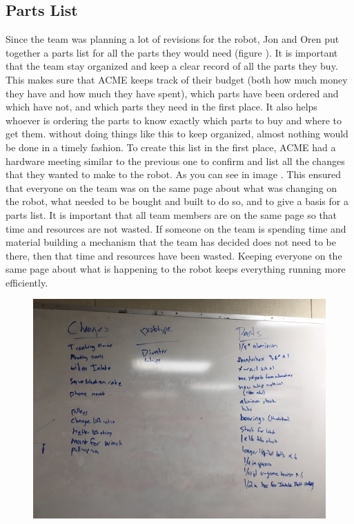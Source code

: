 \documentclass{article}
\begin{document}
\subsection{Parts List}
Since the team was planning a lot of revisions for the robot, Jon and Oren put together a parts list for all the parts they would need (figure ). It is important that the team stay organized and keep a clear record of all the parts they buy. This makes sure that ACME keeps track of their budget (both how much money they have and how much they have spent), which parts have been ordered and which have not, and which parts they need in the first place. It also helps whoever is ordering the parts to know exactly which parts to buy and where to get them. without doing things like this to keep organized, almost nothing would be done in a timely fashion. To create this list in the first place, ACME had a hardware meeting similar to the previous one to confirm and list all the changes that they wanted to make to the robot. As you can see in image . This ensured that everyone on the team was on the same page about what was changing on the robot, what needed to be bought and built to do so, and to give a basis for a parts list. It is important that all team members are on the same page so that time and resources are not wasted. If someone on the team is spending time and material building a mechanism that the team has decided does not need to be there, then that time and resources have been wasted. Keeping everyone on the same page about what is happening to the robot keeps everything running more efficiently.

\begin{figure}
    \centering
    \includegraphics[width=.6 \textwidth]{14_12-03/images/IMG_0422.JPG}
    \caption{}
    \label{fig: Parts list}
\end{figure}
\end{document}
